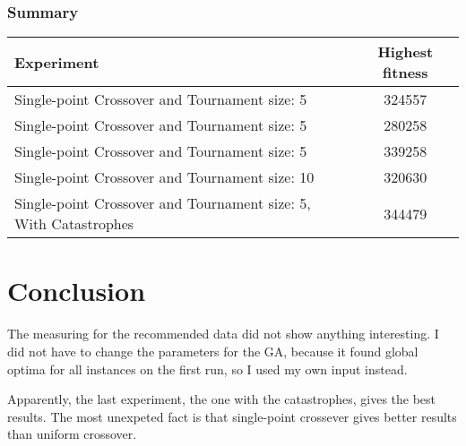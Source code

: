 \documentclass{article}
\begin{document}
\subsubsection{Summary}

\begin{table}[htb]\centering
\begin{tabular}{rr}
\hline
\multicolumn{1}{l}{\textbf{Experiment}} &\multicolumn{1}{c}{\textbf{Highest fitness}}\\ \hline
   \multicolumn{1}{l}{Single-point Crossover and Tournament size: 5}                                     &                        \multicolumn{1}{c}{324557}                                      \\ \hline
     \multicolumn{1}{l}{Single-point Crossover and Tournament size: 5}                                   &                        \multicolumn{1}{c}{280258}                                      \\ \hline
       \multicolumn{1}{l}{Single-point Crossover and Tournament size: 5}                                 &                        \multicolumn{1}{c}{339258}                                      \\ \hline
        \multicolumn{1}{l}{Single-point Crossover and Tournament size: 10}                               &                        \multicolumn{1}{c}{320630}                                      \\ \hline
         \multicolumn{1}{l}{Single-point Crossover and Tournament size: 5, With Catastrophes}                               &                        \multicolumn{1}{c}{344479}                                      \\ \hline
\end{tabular}
\end{table}


\section{Conclusion}
	The measuring for the recommended data did not show anything interesting. I did not have to change the parameters for the GA, because it found global optima for all instances on the first run, so I used my own input instead.

	Apparently, the last experiment, the one with the catastrophes, gives the best results. The most unexpeted fact is that single-point crossever gives better results than uniform crossover.
\end{document}
